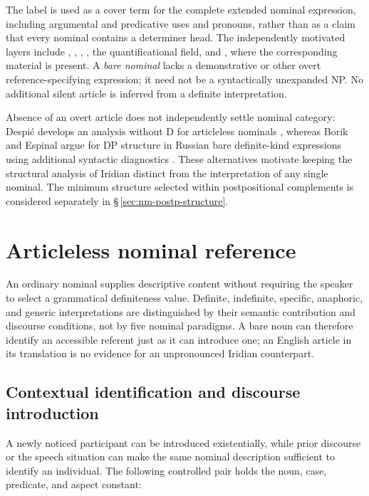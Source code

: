 The label  is used as a cover term for the complete extended
nominal expression, including argumental and predicative uses and pronouns,
rather than as a claim that every
nominal contains a determiner head. The independently motivated layers
include , , , , the
quantificational field, and , where the corresponding material
is present. A \emph{bare nominal} lacks a demonstrative or other overt
reference-specifying expression; it need not be a syntactically unexpanded
NP. No additional silent article is inferred from a definite interpretation.

Absence of an overt article does not independently settle nominal category:
Despić develops an analysis without D for articleless nominals
\cite[§§\,1, 3]{despic2019}, whereas Borik and Espinal argue for DP
structure in Russian bare definite-kind expressions using additional
syntactic diagnostics \cite[§\,3.2]{borikespinal2019}. These alternatives
motivate keeping the structural analysis of Iridian distinct from the
interpretation of any single nominal. The minimum structure selected
within postpositional complements is considered separately in
§\,\ref{sec:nm-postp-structure}.

\FloatBarrier

\section{Articleless nominal reference}
\label{sec:nm-def}

An ordinary nominal supplies descriptive content without requiring the
speaker to select a grammatical definiteness value. Definite, indefinite,
specific, anaphoric, and generic interpretations are distinguished by their
semantic contribution and discourse conditions, not by five nominal
paradigms. A bare noun can therefore identify an accessible referent just
as it can introduce one; an English article in its translation is no
evidence for an unpronounced Iridian counterpart.

\subsection{Contextual identification and discourse introduction}
\label{sec:nm-def-semantics}
\label{sec:nm-bare-noun}
\label{sec:nm-def-restrictions}

A newly noticed participant can be introduced existentially, while prior
discourse or the speech situation can make the same nominal description
sufficient to identify an individual. The following controlled pair holds
the noun, case, predicate, and aspect constant:

